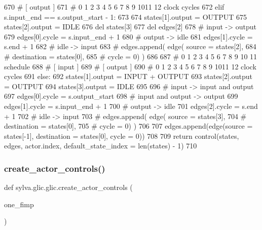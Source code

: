 \begin{DoxyCode}
670     \textcolor{comment}{#             [ output ]}
671     \textcolor{comment}{# 0 1 2 3 4 5 6 7 8 9 1011 12 clock cycles}
672     \textcolor{keywordflow}{elif} s.input\_end == s.output\_start - 1:
673 
674       states[1].output = OUTPUT
675       states[2].output = IDLE
676       del states[3]
677       del edges[2]
678       \textcolor{comment}{# input -> output}
679       edges[0].cycle = s.input\_end + 1
680       \textcolor{comment}{# output -> idle}
681       edges[1].cycle = s.end + 1
682       \textcolor{comment}{# idle -> input}
683       \textcolor{comment}{# edges.append( edge( source = states[2],}
684       \textcolor{comment}{#                     destination = states[0],}
685       \textcolor{comment}{#                     cycle = 0) )}
686 
687     \textcolor{comment}{#   0 1 2 3 4 5 6 7 8 9 10 11 schedule}
688     \textcolor{comment}{#   [ input  ]}
689     \textcolor{comment}{#         [ output ]}
690     \textcolor{comment}{# 0 1 2 3 4 5 6 7 8 9 1011 12 clock cycles}
691     \textcolor{keywordflow}{else}:
692       states[1].output = INPUT + OUTPUT
693       states[2].output = OUTPUT
694       states[3].output = IDLE
695 
696       \textcolor{comment}{# input -> input and output}
697       edges[0].cycle = s.output\_start
698       \textcolor{comment}{# input and output -> output}
699       edges[1].cycle = s.input\_end + 1
700       \textcolor{comment}{# output -> idle}
701       edges[2].cycle = s.end + 1
702       \textcolor{comment}{# idle -> input}
703       \textcolor{comment}{# edges.append( edge( source = states[3],}
704       \textcolor{comment}{#                     destination = states[0],}
705       \textcolor{comment}{#                     cycle = 0) )}
706 
707     edges.append(edge(source = states[-1], destination = states[0], cycle = 0))
708 
709     \textcolor{keywordflow}{return} control(states, edges, actor.index, default\_state\_index = len(states) - 1)
710 
\end{DoxyCode}
\mbox{\label{namespacesylva_1_1glic_1_1glic_a0b179ee41ee4494cf7450be4ca272db4}} 
\subsubsection{\texorpdfstring{create\+\_\+actor\+\_\+controls()}{create\_actor\_controls()}}
{\footnotesize\ttfamily def sylva.\+glic.\+glic.\+create\+\_\+actor\+\_\+controls (\begin{DoxyParamCaption}\item[{}]{one\+\_\+fimp }\end{DoxyParamCaption})}

